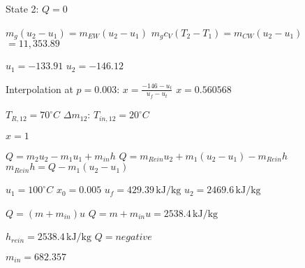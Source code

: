State 2: \( Q = 0 \)  

\( m_g (u_2 - u_1) = m_{EW} (u_2 - u_1) \)  
\( m_g c_V (T_2 - T_1) = m_{CW} (u_2 - u_1) \)  
\( = 11,353.89 \)  

\( u_1 = -133.91 \)  
\( u_2 = -146.12 \)  

Interpolation at \( p = 0.003 \):  
\( x = \frac{-146 - u_t}{u_f - u_t} \)  
\( x = 0.560568 \)  

\( T_{R,12} = 70^\circ C \)  
\( \Delta m_{12} \):  
\( T_{in,12} = 20^\circ C \)  

\( x = 1 \)  

\( Q = m_2 u_2 - m_1 u_1 + m_{in} h \)  
\( Q = m_{Rein} u_2 + m_1 (u_2 - u_1) - m_{Rein} h \)  
\( m_{Rein} h = Q - m_1 (u_2 - u_1) \)  

\( u_1 = 100^\circ C \)  
\( x_0 = 0.005 \)  
\( u_f = 429.39 \, \text{kJ/kg} \)  
\( u_2 = 2469.6 \, \text{kJ/kg} \)  

\( Q = (m + m_{in}) u \)  
\( Q = m + m_{in} u = 2538.4 \, \text{kJ/kg} \)  

\( h_{rein} = 2538.4 \, \text{kJ/kg} \)  
\( Q = negative \)  

\( m_{in} = 682.357 \)